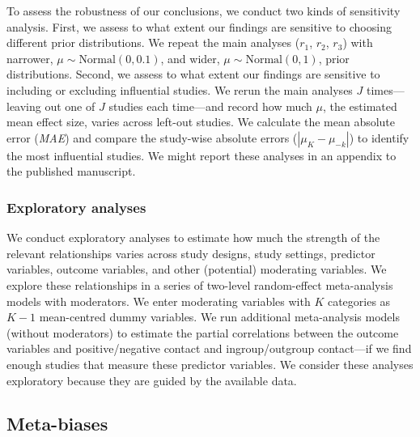 \documentclass[10pt, a4paper]{article}
\begin{document}
To assess the robustness of our conclusions, we conduct two kinds of sensitivity analysis. First, we assess to what extent our findings are sensitive to choosing different prior distributions. We repeat the main analyses ($r_{1}$, $r_{2}$, $r_{3}$) with narrower, $\mu \sim \text{Normal}(0, 0.1)$, and wider, $\mu \sim \text{Normal}(0, 1)$, prior distributions. Second, we assess to what extent our findings are sensitive to including or excluding influential studies. We rerun the main analyses $J$ times---leaving out one of $J$ studies each time---and record how much $\mu$, the estimated mean effect size, varies across left-out studies. We calculate the mean absolute error (\textit{MAE}) and compare the study-wise absolute errors ($|\mu_K - \mu_{-k}|$) to identify the most influential studies.
We might report these analyses in an appendix to the published manuscript.

\subsubsection{Exploratory analyses}
\label{sec:exploratory-analyses}

We conduct exploratory analyses to estimate how much the strength of the relevant relationships varies across study designs, study settings, predictor variables, outcome variables, and other (potential) moderating variables. We explore these relationships in a series of two-level random-effect meta-analysis models with moderators. We enter moderating variables with $K$ categories as $K - 1$ mean-centred dummy variables. We run additional meta-analysis models (without moderators) to estimate the partial correlations between the outcome variables and positive/negative contact and ingroup/outgroup contact---if we find enough studies that measure these predictor variables. We consider these analyses exploratory because they are guided by the available data.

\subsection{Meta-biases}
\label{sec:meta-biases}
\end{document}
